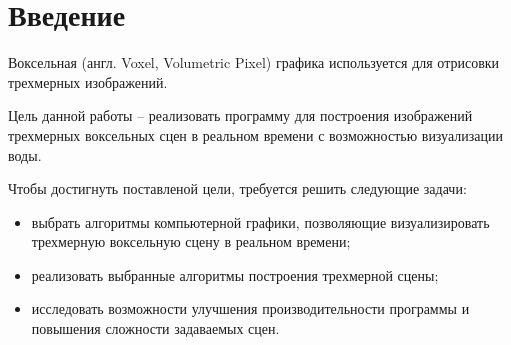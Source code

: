 \chapter*{Введение}

Воксельная (англ. Voxel, Volumetric Pixel) графика используется для отрисовки 
трехмерных изображений. 

Цель данной работы -- реализовать программу для построения 
изображений трехмерных воксельных сцен в реальном времени
с возможностью визуализации воды.

Чтобы достигнуть поставленой цели, требуется решить следующие задачи:
\begin{itemize}
    \item выбрать алгоритмы компьютерной 
          графики, позволяющие визуализировать трехмерную воксельную
          сцену в реальном времени;
    \item реализовать выбранные алгоритмы построения трехмерной сцены;
    \item исследовать возможности улучшения производительности программы
          и повышения сложности задаваемых сцен.
\end{itemize}
